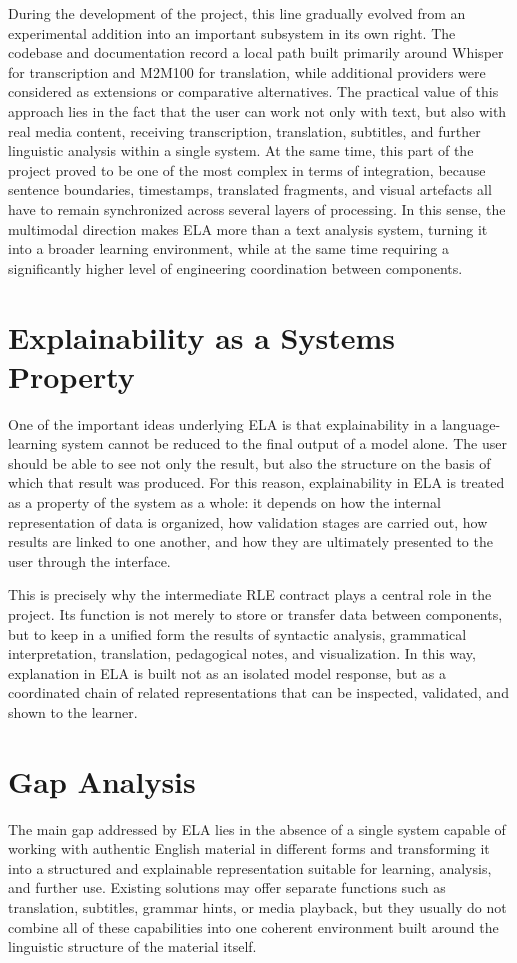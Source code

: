 \documentclass[12pt,a4paper,oneside]{report}
\begin{document}
During the development of the project, this line gradually evolved from an experimental addition into an important subsystem in its own right. The codebase and documentation record a local path built primarily around Whisper for transcription and M2M100 for translation, while additional providers were considered as extensions or comparative alternatives. The practical value of this approach lies in the fact that the user can work not only with text, but also with real media content, receiving transcription, translation, subtitles, and further linguistic analysis within a single system. At the same time, this part of the project proved to be one of the most complex in terms of integration, because sentence boundaries, timestamps, translated fragments, and visual artefacts all have to remain synchronized across several layers of processing. In this sense, the multimodal direction makes ELA more than a text analysis system, turning it into a broader learning environment, while at the same time requiring a significantly higher level of engineering coordination between components.

\section{Explainability as a Systems Property}
One of the important ideas underlying ELA is that explainability in a language-learning system cannot be reduced to the final output of a model alone. The user should be able to see not only the result, but also the structure on the basis of which that result was produced. For this reason, explainability in ELA is treated as a property of the system as a whole: it depends on how the internal representation of data is organized, how validation stages are carried out, how results are linked to one another, and how they are ultimately presented to the user through the interface.

This is precisely why the intermediate RLE contract plays a central role in the project. Its function is not merely to store or transfer data between components, but to keep in a unified form the results of syntactic analysis, grammatical interpretation, translation, pedagogical notes, and visualization. In this way, explanation in ELA is built not as an isolated model response, but as a coordinated chain of related representations that can be inspected, validated, and shown to the learner.

\section{Gap Analysis}
The main gap addressed by ELA lies in the absence of a single system capable of working with authentic English material in different forms and transforming it into a structured and explainable representation suitable for learning, analysis, and further use. Existing solutions may offer separate functions such as translation, subtitles, grammar hints, or media playback, but they usually do not combine all of these capabilities into one coherent environment built around the linguistic structure of the material itself.
\end{document}
